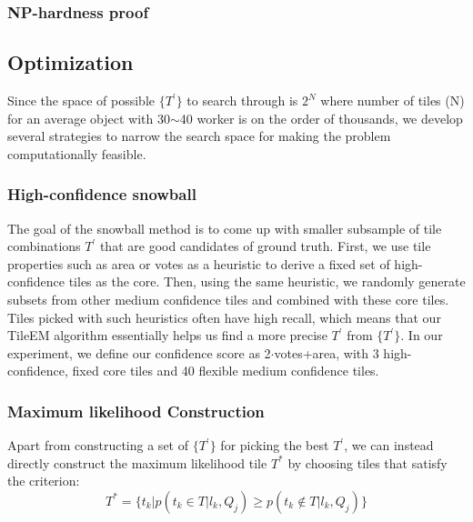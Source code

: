 {\subsubsection{NP-hardness proof}
\subsection{Optimization}
Since the space of possible $\{T^{\prime}\}$ to search through is $2^{N}$ where number of tiles (N) for an average object with 30$\sim$40 worker is on the order of thousands, we develop several strategies to narrow the search space for making the problem computationally feasible. 
\subsubsection{High-confidence snowball}
The goal of the snowball method is to come up with smaller subsample of tile combinations $T^\prime$ that are good candidates of ground truth. First, we use tile properties such as area or votes as a heuristic to derive a fixed set of high-confidence tiles as the core. Then, using the same heuristic, we randomly generate subsets from other medium confidence tiles and combined with these core tiles. Tiles picked with such heuristics often have high recall, which means that our TileEM algorithm essentially helps us find a more precise $T^{\prime}$ from $\{T^{\prime}\}$. In our experiment, we define our confidence score as 2$\cdot$votes+area, with 3 high-confidence, fixed core tiles and 40 flexible medium confidence tiles. 
\subsubsection{Maximum likelihood Construction}
Apart from constructing a set of  $\{T^{\prime}\}$ for picking the best  $T^{\prime}$, we can instead directly construct the maximum likelihood tile $T^*$ by choosing tiles that satisfy the criterion: 
\begin{equation}
T^* = \{t_k|p(t_k\in T|l_k,Q_j)\geq p(t_k\notin T|l_k,Q_j)\}
\end{equation}
}
